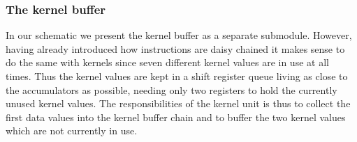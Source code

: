 \subsubsection{The kernel buffer}
In our schematic we present the kernel buffer as a separate submodule. 
However, having already introduced how instructions are daisy chained it makes sense to do the same with kernels since seven different kernel values are in use at all times.
Thus the kernel values are kept in a shift register queue living as close to the accumulators as possible, needing only two registers to hold the currently unused kernel values.
The responsibilities of the kernel unit is thus to collect the first data values into the kernel buffer chain and to buffer the two kernel values which are not currently in use.
